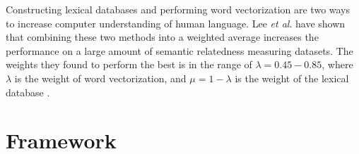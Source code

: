 \documentclass{article}
\begin{document}
Constructing lexical databases and performing word vectorization are two ways to increase computer understanding of human language. Lee \emph{et al}. have shown that combining these two methods into a weighted average increases the performance on a large amount of semantic relatedness measuring datasets. The weights they found to perform the best is in the range of $\lambda = 0.45-0.85$, where $\lambda$ is the weight of word vectorization, and $\mu = 1-\lambda$ is the weight of the lexical database \cite{lee2016combining}.





\section{Framework} \label{sec:framework}
\end{document}

